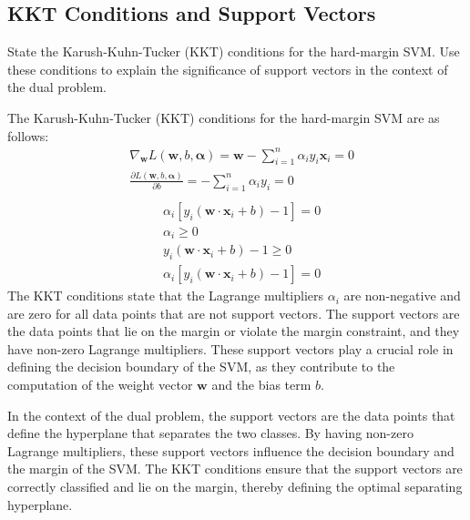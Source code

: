\subsection{KKT Conditions and Support Vectors}
State the Karush-Kuhn-Tucker (KKT) conditions for the hard-margin SVM. Use these conditions to explain the significance of support vectors in the context of the dual problem.
\begin{qsolve}
    \begin{qsolve}[]
        The Karush-Kuhn-Tucker (KKT) conditions for the hard-margin SVM are as follows:
        \begin{align*}
            &\nabla_{\mathbf{w}} L(\mathbf{w}, b, \boldsymbol{\alpha}) = \mathbf{w} - \sum_{i=1}^{n} \alpha_i y_i \mathbf{x}_i = 0 \\
            &\frac{\partial L(\mathbf{w}, b, \boldsymbol{\alpha})}{\partial b} = -\sum_{i=1}^{n} \alpha_i y_i = 0 \\
        \end{align*}
        \splitqsolve[\splitqsolve]
        \begin{align*}
            &\alpha_i \left[ y_i(\mathbf{w} \cdot \mathbf{x}_i + b) - 1 \right] = 0 \\
            &\alpha_i \geq 0 \\
            &y_i(\mathbf{w} \cdot \mathbf{x}_i + b) - 1 \geq 0 \\
            &\alpha_i \left[ y_i(\mathbf{w} \cdot \mathbf{x}_i + b) - 1 \right] = 0
        \end{align*}
        The KKT conditions state that the Lagrange multipliers $\alpha_i$ are non-negative and are zero for all data points that are not support vectors. The support vectors are the data points that lie on the margin or violate the margin constraint, and they have non-zero Lagrange multipliers. These support vectors play a crucial role in defining the decision boundary of the SVM, as they contribute to the computation of the weight vector $\mathbf{w}$ and the bias term $b$.

        In the context of the dual problem, the support vectors are the data points that define the hyperplane that separates the two classes. By having non-zero Lagrange multipliers, these support vectors influence the decision boundary and the margin of the SVM. The KKT conditions ensure that the support vectors are correctly classified and lie on the margin, thereby defining the optimal separating hyperplane.
    \end{qsolve}
\end{qsolve}
